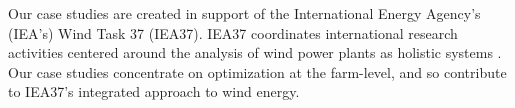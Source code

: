 Our case studies are created in support of the International Energy Agency's (IEA's) Wind Task 37 (IEA37).
IEA37 coordinates international research activities centered around the analysis of wind power plants as holistic systems \cite{IEATask372017}. Our case studies concentrate on optimization at the farm-level, and so contribute to IEA37's integrated approach \cite{IEATask372017} to wind energy.
